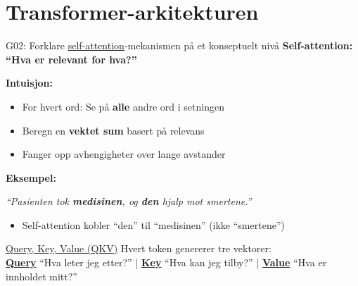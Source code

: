 \documentclass[aspectratio=169, 10pt]{beamer}
\begin{document}
\section{Transformer-arkitekturen}

\begin{frame}{G02: Forklare \href{https://en.wikipedia.org/wiki/Attention_(machine_learning)}{self-attention}-mekanismen på et konseptuelt nivå}
    \textbf{Self-attention: ``Hva er relevant for hva?''}

    \vspace{0.2cm}
    \textbf{Intuisjon:}
    \begin{itemize}
        \item For hvert ord: Se på \textbf{alle} andre ord i setningen
        \item Beregn en \textbf{vektet sum} basert på relevans
        \item Fanger opp avhengigheter over lange avstander
    \end{itemize}

    \vspace{0.2cm}
    \textbf{Eksempel:}
    \begin{center}
        \textit{``Pasienten tok \textbf{medisinen}, og \textbf{den} hjalp mot smertene.''}
    \end{center}
    \begin{itemize}
        \item Self-attention kobler ``den'' til ``medisinen'' (ikke ``smertene'')
    \end{itemize}

    \vspace{0.1cm}
    \begin{block}{\footnotesize \href{https://jalammar.github.io/illustrated-transformer/\#self-attention-at-a-high-level}{Query, Key, Value (QKV)}}
        \footnotesize Hvert token genererer tre vektorer: \\
        \href{https://en.wikipedia.org/wiki/Attention_(machine_learning)\#Queries,_keys,_and_values}{\textbf{Query}} ``Hva leter jeg etter?'' |
        \href{https://en.wikipedia.org/wiki/Attention_(machine_learning)\#Queries,_keys,_and_values}{\textbf{Key}} ``Hva kan jeg tilby?'' |
        \href{https://en.wikipedia.org/wiki/Attention_(machine_learning)\#Queries,_keys,_and_values}{\textbf{Value}} ``Hva er innholdet mitt?''
    \end{block}
\end{frame}
\end{document}

